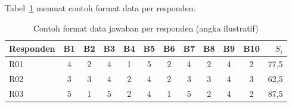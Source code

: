 

Tabel~\ref{tab:data-lengkap} memuat contoh format data per responden.

\begin{landscape}
\begin{table}[htbp]
  \centering
  \caption{Contoh format data jawaban per responden (angka ilustratif)}
  \label{tab:data-lengkap}
  \begin{tabular}{@{}lccccccccccr@{}}
    \toprule
    Responden & B1 & B2 & B3 & B4 & B5 & B6 & B7 & B8 & B9 & B10 & $S_i$ \\
    \midrule
    R01 & 4 & 2 & 4 & 1 & 5 & 2 & 4 & 2 & 4 & 2 & 77,5 \\
    R02 & 3 & 3 & 4 & 2 & 4 & 2 & 3 & 3 & 4 & 3 & 62,5 \\
    R03 & 5 & 1 & 5 & 2 & 4 & 1 & 5 & 2 & 4 & 2 & 87,5 \\
    \bottomrule
  \end{tabular}
\end{table}
\end{landscape}

